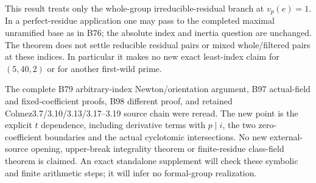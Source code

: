 \begin{remark}
\label{rem:B-RD99-scope}
This result treats only the whole-group irreducible-residual
branch at $v_p(e)=1$. In a perfect-residue application one may
pass to the completed maximal unramified base as in B76; the
absolute index and inertia question are unchanged. The theorem
does not settle reducible residual pairs or mixed whole/filtered
pairs at these indices. In particular it makes no new exact
least-index claim for $(5,40,2)$ or for another first-wild prime.

The complete B79 arbitrary-index Newton/orientation argument,
B97 actual-field and fixed-coefficient proofs, B98 different
proof, and retained Colmez3.7/3.10/3.13/3.17--3.19 source chain
were reread. The new point is the explicit $t$ dependence,
including derivative terms with $p\mid i$, the two zero-coefficient
boundaries and the actual cyclotomic intersections. No new
external-source opening, upper-break integrality theorem or
finite-residue class-field theorem is claimed. An exact standalone
supplement will check these symbolic and finite arithmetic steps;
it will infer no formal-group realization.
\end{remark}
